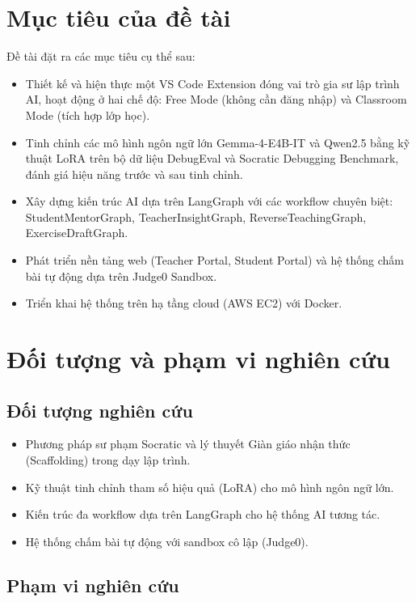 \section{Mục tiêu của đề tài}

Đề tài đặt ra các mục tiêu cụ thể sau:

\begin{itemize}
    \item Thiết kế và hiện thực một VS Code Extension đóng vai trò gia sư lập trình AI, hoạt động ở hai chế độ: Free Mode (không cần đăng nhập) và Classroom Mode (tích hợp lớp học).
    \item Tinh chỉnh các mô hình ngôn ngữ lớn Gemma-4-E4B-IT và Qwen2.5 bằng kỹ thuật LoRA trên bộ dữ liệu DebugEval và Socratic Debugging Benchmark, đánh giá hiệu năng trước và sau tinh chỉnh.
    \item Xây dựng kiến trúc AI dựa trên LangGraph với các workflow chuyên biệt: StudentMentorGraph, TeacherInsightGraph, ReverseTeachingGraph, ExerciseDraftGraph.
    \item Phát triển nền tảng web (Teacher Portal, Student Portal) và hệ thống chấm bài tự động dựa trên Judge0 Sandbox.
    \item Triển khai hệ thống trên hạ tầng cloud (AWS EC2) với Docker.
\end{itemize}

\section{Đối tượng và phạm vi nghiên cứu}

\subsection{Đối tượng nghiên cứu}

\begin{itemize}
    \item Phương pháp sư phạm Socratic và lý thuyết Giàn giáo nhận thức (Scaffolding) trong dạy lập trình.
    \item Kỹ thuật tinh chỉnh tham số hiệu quả (LoRA) cho mô hình ngôn ngữ lớn.
    \item Kiến trúc đa workflow dựa trên LangGraph cho hệ thống AI tương tác.
    \item Hệ thống chấm bài tự động với sandbox cô lập (Judge0).
\end{itemize}

\subsection{Phạm vi nghiên cứu}

